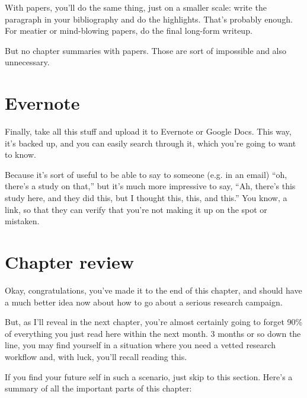 With papers, you'll do the same thing, just on a smaller scale: write the
paragraph in your bibliography and do the highlights. That's probably
enough. For meatier or mind-blowing papers, do the final long-form writeup.

But no chapter summaries with papers. Those are sort of impossible and also
unnecessary.

\section{Evernote}

Finally, take all this stuff and upload it to Evernote or Google Docs. This way,
it's backed up, and you can easily search through it, which you're going to want
to know.

Because it's sort of useful to be able to say to someone (e.g. in an email)
``oh, there's a study on that,'' but it's much more impressive to say, ``Ah,
there's this study here, and they did this, but I thought this, this, and
this.'' You know, a link, so that they can verify that you're not making it up
on the spot or mistaken.


\section{Chapter review}

Okay, congratulations, you've made it to the end of this chapter, and should
have a much better idea now about how to go about a serious research campaign.

But, as I'll reveal in the next chapter, you're almost certainly going to forget
90\% of everything you just read here within the next month. 3 months or so down
the line, you may find yourself in a situation where you need a vetted research
workflow and, with luck, you'll recall reading this.

If you find your future self in such a scenario, just skip to this
section. Here's a summary of all the important parts of this chapter:

